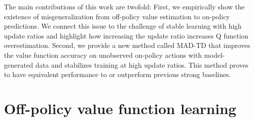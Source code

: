 The main contributions of this work are twofold:
First, we empirically show the existence of misgeneralization from off-policy value estimation to on-policy predictions. We connect this issue to the challenge of stable learning with high update ratios and highlight how increasing the update ratio increases Q function overestimation.
Second, we provide a new method called MAD-TD that improves the value function accuracy on unobserved on-policy actions with model-generated data and stabilizes training at high update ratios. This method proves to have equivalent performance to or outperform previous strong baselines.

\section{Off-policy value function learning}

